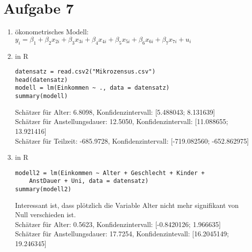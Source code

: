 \documentclass{article}
\begin{document}
	\section*{Aufgabe 7}
	\begin{enumerate}[label=(\alph*)]
		\item ökonometrisches Modell: $y_i = \beta_1 + \beta_2x_{2i} + \beta_3x_{3i} + \beta_4x_{4i} + \beta_5x_{5i} + \beta_6x_{6i} + \beta_7x_{7i} + u_i$
		\item in R
		\begin{lstlisting}[style=R]
datensatz = read.csv2("Mikrozensus.csv")
head(datensatz)
modell = lm(Einkommen ~ ., data = datensatz)
summary(modell)
		\end{lstlisting}
		Schätzer für Alter: 6.8098, Konfidenzintervall: [5.488043; 8.131639] \\
		Schätzer für Anstellungsdauer: 12.5050, Konfidenzintervall: [11.088655; 13.921416] \\
		Schätzer für Teilzeit: -685.9728, Konfidenzintervall: [-719.082560; -652.862975]
		\item in R
		\begin{lstlisting}[style=R]
modell2 = lm(Einkommen ~ Alter + Geschlecht + Kinder + 
	AnstDauer + Uni, data = datensatz)
summary(modell2)
		\end{lstlisting}
		Interessant ist, dass plötzlich die Variable Alter nicht mehr signifikant von Null verschieden ist. \\
		Schätzer für Alter: 0.5623, Konfidenzintervall: [-0.8420126; 1.966635] \\
		Schätzer für Anstellungsdauer: 17.7254, Konfidenzintevall: [16.2045149; 19.246345]
	\end{enumerate}
	
\end{document}
